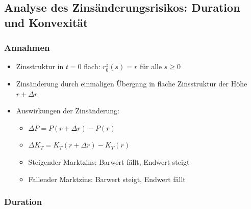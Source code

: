 \documentclass[12pt]{report}
\theoremstyle{dotless}
\theoremstyle{definition}
\begin{document}
\subsection{Analyse des Zins\"anderungsrisikos: Duration und Konvexit\"at}

\subsubsection{Annahmen}

\begin{itemize}
	\item Zinsstruktur in $t=0$ flach: $r_0^z (s) = r$ f\"ur alle $s \geq 0$
	\item Zins\"anderung durch einmaligen \"Ubergang in flache Zinsstruktur der H\"ohe $r + \Delta r$
	\item Auswirkungen der Zins\"anderung:
	\begin{itemize}
		\item $\Delta P = P(r + \Delta r) -P(r)$
		\item $\Delta K_T = K_T(r + \Delta r) - K_T(r)$
		\item Steigender Marktzins: Barwert f\"allt, Endwert steigt
		\item Fallender Marktzins: Barwert steigt, Endwert f\"allt
	\end{itemize}
\end{itemize}

\subsubsection{Duration}
\end{document}
